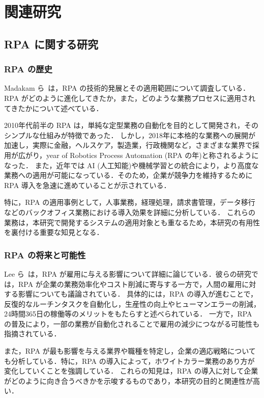 \chapter{関連研究}
\label{ch:rw}

\quad

\section{RPA に関する研究}
\label{sec:rpa}

\subsection{RPA の歴史}
\label{subsec:rpa_history}

Madakam ら~\cite{Madakam2019}は，RPA の技術的発展とその適用範囲について調査している．RPA がどのように進化してきたか，また，どのような業務プロセスに適用されてきたかについて述べている．

2010年代前半の RPA は，単純な定型業務の自動化を目的として開発され，そのシンプルな仕組みが特徴であった．
しかし，2018年に本格的な業務への展開が加速し，実際に金融，ヘルスケア，製造業，行政機関など，さまざまな業界で採用が広がり，year of Robotics Process Automation (RPA の年)と称されるようになった．
また，近年では AI (人工知能)や機械学習との統合により，より高度な業務への適用が可能になっている．そのため，企業が競争力を維持するために RPA 導入を急速に進めていることが示されている．

特に，RPA の適用事例として，人事業務，経理処理，請求書管理，データ移行などのバックオフィス業務における導入効果を詳細に分析している．
これらの業務は，本研究で開発するシステムの適用対象とも重なるため，本研究の有用性を裏付ける重要な知見となる．

\subsection{RPA の将来と可能性}
\label{subsec:rpa_future}

Lee ら~\cite{lee2023}は，RPA が雇用に与える影響について詳細に論じている．彼らの研究では，RPA が企業の業務効率化やコスト削減に寄与する一方で，人間の雇用に対する影響についても議論されている．
具体的には，RPA の導入が進むことで，反復的なルーチンタスクを自動化し，生産性の向上やヒューマンエラーの削減，24時間365日の稼働等のメリットをもたらすと述べられている．
一方で，RPA の普及により，一部の業務が自動化されることで雇用の減少につながる可能性も指摘されている．

また，RPA が最も影響を与える業界や職種を特定し，企業の適応戦略についても分析している．特に，RPA の導入によって，ホワイトカラー業務のあり方が変化していくことを強調している．
これらの知見は，RPA の導入に対して企業がどのように向き合うべきかを示唆するものであり，本研究の目的と関連性が高い．

